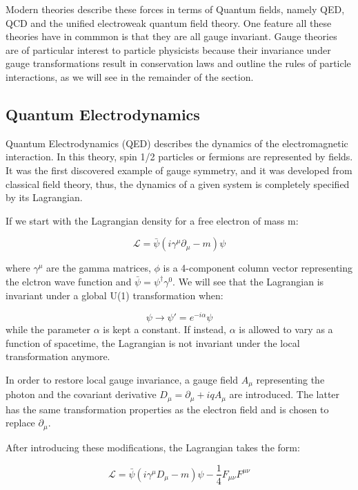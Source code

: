 Modern theories describe these forces in terms of Quantum fields, namely QED, QCD and the unified electroweak quantum field theory. One feature all these theories have in commmon is that they are all gauge invariant. Gauge theories are of particular interest to particle physicists because their invariance under gauge transformations result in conservation laws and outline the rules of particle interactions, as we will see in the remainder of the section.  

\subsection{Quantum Electrodynamics}

Quantum Electrodynamics (QED) describes the dynamics of the electromagnetic interaction. In this theory, spin 1/2 particles or fermions are represented by fields. It was the first discovered example of gauge symmetry, and it was developed from classical field theory, thus, the dynamics of a given system is completely specified by its Lagrangian.

If we start with the Lagrangian density for a free electron of mass m:

\begin{equation}
\mathcal{L} = \bar{\psi}(i\gamma^{\mu}\partial_{\mu} - m)\psi
\end{equation}

where $\gamma^{\mu}$ are the gamma matrices, $\phi$ is a 4-component column vector representing the elctron wave function and $\bar{\psi}=\psi^{\dagger}\gamma^{0}$. We will see that the Lagrangian is invariant under a global U(1) transformation when:

\begin{equation}
\psi \rightarrow \psi '= e^{-i\alpha}\psi
\end{equation}
while the parameter $\alpha$ is kept a constant. If instead, $\alpha$ is allowed to vary as a function of spacetime, the Lagrangian is not invariant under the local transformation anymore. 

In order to restore local gauge invariance, a gauge field $A_{\mu}$ representing the photon and the covariant derivative $D_{\mu} = \partial_{\mu} + iq A_{\mu}$ are introduced. The latter has the same transformation properties as the electron field and is chosen to replace $\partial_{\mu}$.

After introducing these modifications, the Lagrangian takes the form:

\begin{equation}
\mathcal{L} = \bar{\psi}(i\gamma^{\mu}D_{\mu}-m)\psi - \frac{1}{4}F_{\mu\nu}F^{\mu\nu}
\end{equation}

